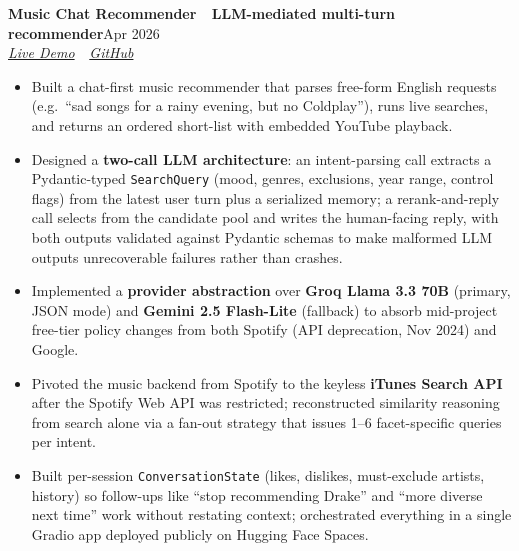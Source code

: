 \documentclass[11pt,letterpaper]{article}
\newcommand{\entry}[4]{%
  \noindent\textbf{\color{ink}#1}\hfill{\color{soft}\small #3}\\[1pt]%
  \textit{\color{muted}#2}\hfill\textit{\color{soft}\small #4}%
  \vspace{2pt}%
}
\begin{document}
\vspace{4pt}
\entry{Music Chat Recommender \,\textemdash\, LLM-mediated multi-turn recommender}{\href{https://huggingface.co/spaces/Cedric1218/music-chat-recommender}{Live Demo} \,\textbar\, \href{https://github.com/cedricshan/music-chat-recommender}{GitHub}}{Apr 2026}{}
\begin{itemize}
  \item Built a chat-first music recommender that parses free-form English requests (e.g.\ ``sad songs for a rainy evening, but no Coldplay''), runs live searches, and returns an ordered short-list with embedded YouTube playback.
  \item Designed a \textbf{two-call LLM architecture}: an intent-parsing call extracts a Pydantic-typed \texttt{SearchQuery} (mood, genres, exclusions, year range, control flags) from the latest user turn plus a serialized memory; a rerank-and-reply call selects from the candidate pool and writes the human-facing reply, with both outputs validated against Pydantic schemas to make malformed LLM outputs unrecoverable failures rather than crashes.
  \item Implemented a \textbf{provider abstraction} over \textbf{Groq Llama 3.3 70B} (primary, JSON mode) and \textbf{Gemini 2.5 Flash-Lite} (fallback) to absorb mid-project free-tier policy changes from both Spotify (API deprecation, Nov 2024) and Google.
  \item Pivoted the music backend from Spotify to the keyless \textbf{iTunes Search API} after the Spotify Web API was restricted; reconstructed similarity reasoning from search alone via a fan-out strategy that issues 1--6 facet-specific queries per intent.
  \item Built per-session \texttt{ConversationState} (likes, dislikes, must-exclude artists, history) so follow-ups like ``stop recommending Drake'' and ``more diverse next time'' work without restating context; orchestrated everything in a single Gradio app deployed publicly on Hugging Face Spaces.
\end{itemize}
\end{document}
